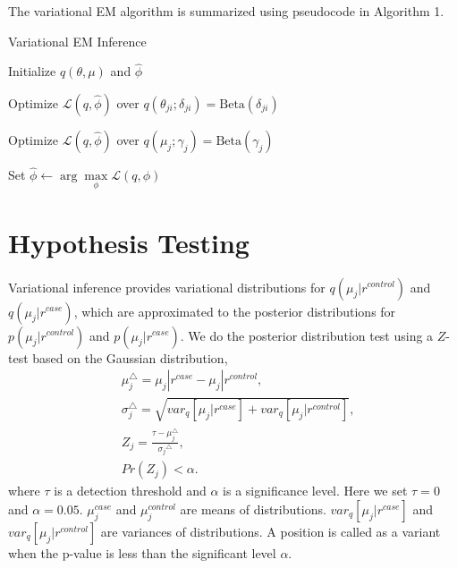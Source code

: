 \documentclass[11pt,reqno]{amsart}
\begin{document}
The variational EM algorithm is summarized using pseudocode in Algorithm 1.
\begin{algorithm}[ht]
  \caption{Variational EM Inference}

  \begin{algorithmic}[1]

  \State Initialize $ q(\theta, \mu) $ and $\hat{\phi}$

  \Repeat

	\Repeat

			\State Optimize $\mathcal{L}(q, \hat{\phi})$ over $q(\theta_{ji}; \delta_{ji}) = \text{Beta} (\delta_{ji})$
			\EndFor
		\EndFor

            \State Optimize $\mathcal{L}(q, \hat{\phi})$ over $q(\mu_j; \gamma_j) = \text{Beta} (\gamma_j)$
        \EndFor


    \State Set $\hat{\phi} \leftarrow \arg \max\limits_{\phi}
            \mathcal{L}(q,\phi)$

  \end{algorithmic}

\end{algorithm}
%
\section{Hypothesis Testing}
Variational inference provides variational distributions for $q(\mu_j|r^{control})$ and $q(\mu_j|r^{case})$, which are approximated to the posterior distributions for $p(\mu_j|r^{control})$ and $p(\mu_j|r^{case})$.
We do the posterior distribution test using a $Z$-test based on the Gaussian distribution,
\begin{align}
& \mu_j^{\triangle} = \mu_j|r^{case}-\mu_j|r^{control},\\
& \sigma_j^{\triangle} = \sqrt {var_q{[\mu_j|r^{case}]} + var_q{[\mu_j|r^{control}]}},\\
& Z_j = \frac{\tau - \mu_j^{\triangle}}{{\sigma_j}^{\triangle}},\\
& Pr(Z_j) < \alpha.
\end{align}
where $\tau$ is a detection threshold and $\alpha$ is a significance level. Here we set $\tau = 0$ and $\alpha = 0.05$.
$\mu_j^{case}$ and $\mu_j^{control}$ are means of distributions.
$var_q{[\mu_j|r^{case}]}$ and  $var_q{[\mu_j|r^{control}]}$ are variances of distributions.
A position is called as a variant when the p-value is less than the significant level $\alpha$.
\end{document}
